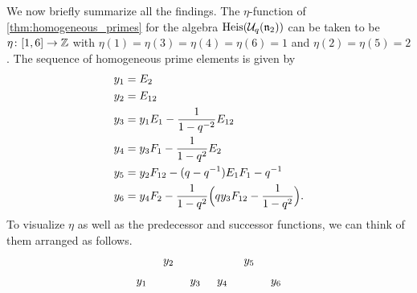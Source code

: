 \begin{example}
	We now briefly summarize all the findings. The $\eta$-function of
	\cref{thm:homogeneous_primes} for the algebra $\operatorname{Heis}(\mathcal{U}_q(\mathfrak{n}_2))$ can be taken to be $\eta
		\colon [1, 6] \to \mathbb{Z}$ with $\eta(1)=\eta(3)=\eta(4)=\eta(6) = 1$ and $\eta(2) =
		\eta(5) = 2$. The sequence of homogeneous prime elements is given by
	\begin{equation}\label{eq:heisenberg_hom_primes}
		\begin{aligned}
			y_1 & = E_2                                                                      \\
			y_2 & = E_{12}                                                                   \\
			y_3 & = y_1 E_1 - \frac{1}{1- q^{-2}}E_{12}                                      \\
			y_4 & = y_3 F_1 - \frac{1}{1-q^2} E_2                                            \\
			y_5 & = y_2 F_{12} - (q - q^{-1}) E_1 F_1 - q ^{-1}                                \\
			y_6 & = y_4 F_2 - \frac{1}{1-q^2} \Bigl(q y_3 F_{12} - \frac{1}{1 - q^2} \Bigr).
		\end{aligned}
	\end{equation}
	To visualize $\eta$ as well as the predecessor and successor functions, we can think of
	them arranged as follows.
	\begin{equation*}
		\begin{tikzcd}[sep=tiny]
			& y_2 & & & y_5 \\
			y_1 & & y_3 & y_4 & & y_6
		\end{tikzcd}
	\end{equation*}

\end{example}

